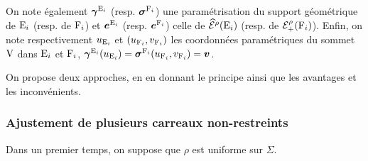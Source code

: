 On note également $\bm{\gamma}^{\mathrm{E}_i}$ (resp. $\bm{\sigma}^{\mathrm{F}_i}$) une paramétrisation du support géométrique de $\mathrm{E}_i$ (resp. de $\mathrm{F}_i$) et $\bm{e}^{\mathrm{E}_i}$ (resp. $\bm{e}^{\mathrm{F}_i}$) celle de $\pseudoEdS{\brepedge_i}{\rho}$ (resp. de ${\mathcal{E}}_{+}^{\rho}({\mathrm{F}_i})$).
Enfin, on note respectivement $u_{\mathrm{E}_i}$ et $(u_{\mathrm{F}_i}, v_{\mathrm{F}_i})$ les coordonnées paramétriques du sommet $\mathrm{V}$ dans $\mathrm{E}_i$ et $\mathrm{F}_i$, \ie $\bm{\gamma}^{\mathrm{E}_i}(u_{\mathrm{E}_i}) = \bm{\sigma}^{\mathrm{F}_i}(u_{\mathrm{F}_i}, v_{\mathrm{F}_i}) = \bm{v}$.
\par
On propose deux approches, en en donnant le principe ainsi que les avantages et les inconvénients.

%

\subsubsection{Ajustement de plusieurs carreaux non-restreints}%
\label{section:quadrangulation_polygone_spherique}
Dans un premier temps, on suppose que $\rho$ est uniforme sur $\Sigma$. 

\newcommand*{\incrementnotation}[2]{#1_{\text{#2}}}%
\newcommand{\iplus}{\incrementnotation{i}{+}}%
\newcommand{\imoins}{\incrementnotation{i}{--}}%

